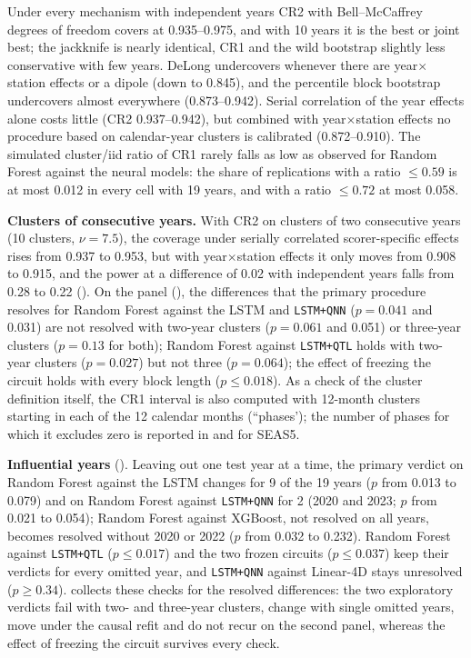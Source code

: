\documentclass[11pt,a4paper]{article}
\begin{document}
Under every mechanism with independent years CR2 with Bell--McCaffrey degrees of freedom covers at 0.935--0.975, and with 10 years it is the best or joint best; the jackknife is nearly identical, CR1 and the wild bootstrap slightly less conservative with few years. DeLong undercovers whenever there are year$\times$station effects or a dipole (down to 0.845), and the percentile block bootstrap undercovers almost everywhere (0.873--0.942). Serial correlation of the year effects alone costs little (CR2 0.937--0.942), but combined with year$\times$station effects no procedure based on calendar-year clusters is calibrated (0.872--0.910). The simulated cluster/iid ratio of CR1 rarely falls as low as observed for Random Forest against the neural models: the share of replications with a ratio $\le0.59$ is at most 0.012 in every cell with 19 years, and with a ratio $\le0.72$ at most 0.058.

\textbf{Clusters of consecutive years.} With CR2 on clusters of two consecutive years (10 clusters, $\nu=7.5$), the coverage under serially correlated scorer-specific effects rises from 0.937 to 0.953, but with year$\times$station effects it only moves from 0.908 to 0.915, and the power at a difference of 0.02 with independent years falls from 0.28 to 0.22 (). On the panel (), the differences that the primary procedure resolves for Random Forest against the LSTM and \texttt{LSTM+QNN} ($p=0.041$ and 0.031) are not resolved with two-year clusters ($p=0.061$ and 0.051) or three-year clusters ($p=0.13$ for both); Random Forest against \texttt{LSTM+QTL} holds with two-year clusters ($p=0.027$) but not three ($p=0.064$); the effect of freezing the circuit holds with every block length ($p\le0.018$). As a check of the cluster definition itself, the CR1 interval is also computed with 12-month clusters starting in each of the 12 calendar months (``phases'); the number of phases for which it excludes zero is reported in  and for SEAS5.

\textbf{Influential years} (). Leaving out one test year at a time, the primary verdict on Random Forest against the LSTM changes for 9 of the 19 years ($p$ from 0.013 to 0.079) and on Random Forest against \texttt{LSTM+QNN} for 2 (2020 and 2023; $p$ from 0.021 to 0.054); Random Forest against XGBoost, not resolved on all years, becomes resolved without 2020 or 2022 ($p$ from 0.032 to 0.232). Random Forest against \texttt{LSTM+QTL} ($p\le0.017$) and the two frozen circuits ($p\le0.037$) keep their verdicts for every omitted year, and \texttt{LSTM+QNN} against Linear-4D stays unresolved ($p\ge0.34$).  collects these checks for the resolved differences: the two exploratory verdicts fail with two- and three-year clusters, change with single omitted years, move under the causal refit and do not recur on the second panel, whereas the effect of freezing the circuit survives every check.
\end{document}
